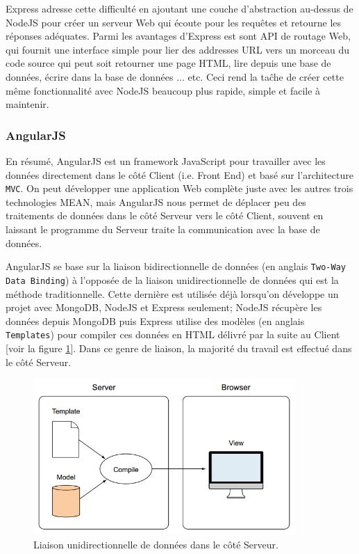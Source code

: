 \documentclass[a4paper,11pt,oneside]{report}
\begin{document}
Express adresse cette difficulté en ajoutant une couche d'abstraction au-dessus de NodeJS pour créer un serveur Web qui écoute pour les requêtes et retourne les réponses adéquates. Parmi les avantages d'Express est sont API de routage Web, qui fournit une interface simple pour lier des addresses URL vers un morceau du code source qui peut soit retourner une page HTML, lire depuis une base de données, écrire dans la base de données ... etc. Ceci rend la taĉhe de créer cette même fonctionnalité avec NodeJS beaucoup plus rapide, simple et facile à maintenir.

\subsubsection{AngularJS}

En résumé, AngularJS est un framework JavaScript pour travailler avec les données directement dans le côté Client (i.e. Front End) et basé sur l'architecture \texttt{MVC}\cite{mvcArchitecture}. On peut développer une application Web complète juste avec les autres trois technologies MEAN, mais AngularJS nous permet de déplacer peu des traitements de données dans le côté Serveur vers le côté Client, souvent en laissant le programme du Serveur traite la communication avec la base de données.
\newline

AngularJS se base sur la liaison bidirectionnelle de données (en anglais \texttt{Two-Way Data Binding}) à l'opposée de la liaison unidirectionnelle de données qui est la méthode traditionnelle. Cette dernière est utilisée déjà lorsqu'on développe un projet avec MongoDB, NodeJS et Express seulement; NodeJS récupère les données depuis MongoDB puis Express utilise des modèles (en anglais \texttt{Templates}) pour compiler ces données en HTML délivré par la suite au Client [voir la figure \ref{fig:one-way-data-binding}]. Dans ce genre de liaison, la majorité du travail est effectué dans le côté Serveur. 

\begin{figure}[H]
    \centering
    \includegraphics[width=10cm]{one-way-data-binding.png}
    \caption{Liaison unidirectionnelle de données dans le côté Serveur.}
    \label{fig:one-way-data-binding}
\end{figure}
\end{document}
